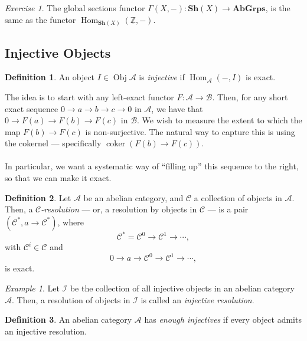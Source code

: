 \documentclass[a4paper]{report}
\theoremstyle{definition}
\newtheorem{definition}{Definition}
\theoremstyle{remark}
\theoremstyle{proposition}
\theoremstyle{conjecture}
\theoremstyle{lemma}
\theoremstyle{corollary}
\theoremstyle{exercise}
\newtheorem{exercise}{Exercise}
\theoremstyle{example}
\newtheorem{example}{Example}
\newcommand{\mcal}{\mathcal}
\newcommand{\on}{\operatorname}
\begin{document}
\begin{exercise}
    The global sections functor $\Gamma(X,-) : \mathbf{Sh}(X) \to \mathbf{AbGrps}$, is the same as the functor $\on{Hom}_{\mathbf{Sh}(X)}(\underline{\mathbb{Z}},-)$.
\end{exercise}

\subsection{Injective Objects}

\begin{definition}
    An object $I \in \on{Obj}\mcal{A}$ is \emph{injective} if 
    $\on{Hom}_\mcal{A}(-,I)$ is exact.
\end{definition}

The idea is to start with any left-exact functor $F:\mcal{A} \to \mcal{B}$.
Then, for any short exact sequence $0\to a \to b \to c \to 0$ in $\mcal{A}$,
we have that $0 \to F(a) \to F(b) \to F(c)$ in $\mcal{B}$. We wish to
measure the extent to which the map $F(b) \to F(c)$ is non-surjective.
The natural way to capture this is using the cokernel --- specifically 
$\on{coker}(F(b) \to F(c))$.\\\\
In particular, we want a systematic way of ``filling up'' this sequence 
to the right, so that we can make it exact.

\begin{definition}
    Let $\mcal{A}$ be an abelian category, and $\mcal{C}$ a collection 
    of objects in $\mcal{A}$. Then, a \emph{$\mcal{C}$-resolution} --- 
    or, a resolution by objects in $\mcal{C}$ --- is a pair 
    $(\mcal{C}^\ast, a \to \mcal{C}^\ast)$, where 
    $$\mcal{C}^\ast = \mcal{C}^0 \to \mcal{C}^1 \to \cdots,$$
    with $\mcal{C}^i \in \mcal{C}$ and 
    $$0 \longrightarrow a \longrightarrow \mcal{C}^0 \longrightarrow \mcal{C}^1 \longrightarrow \cdots,$$
    is exact.
\end{definition}

\begin{example}
    Let $\mcal{I}$ be the collection of all injective objects in an abelian
    category $\mcal{A}$. Then, a resolution of objects in $\mcal{I}$ 
    is called an \emph{injective resolution}.
\end{example}

\begin{definition}
    An abelian category $\mcal{A}$ has \emph{enough injectives} if every 
    object admits an injective resolution.
\end{definition}
\end{document}
